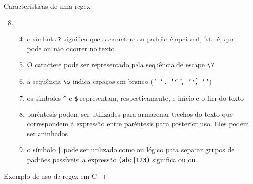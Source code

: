 \begin{frame}[fragile]{Características de uma regex}

    \begin{enumerate}
        \setcounter{enumi}{7}
        \item[] \begin{enumerate}
            \setcounter{enumii}{3}
            \item o símbolo \verb|?| significa que o caractere ou padrão é opcional, isto é, que pode ou não ocorrer no texto
        \pause
            \item O caractere  pode ser representado pela sequência de escape 
                \verb|\?|
        \pause
            \item a sequência \verb|\s| indica espaços em branco (\texttt{' ',  '\t', '\r', '\n'})
        \pause
            \item os símbolos \verb|^| e \verb|$| representam, respectivamente, o início e o fim 
                do texto
        \pause
            \item parêntesis podem ser utilizados para armazenar trechos do texto que correspondem à expressão entre parêntesis para posterior uso. Eles podem ser aninhados
        \pause
            \item o símbolo \texttt{|} pode ser utilizado como ou lógico para separar grupos de padrões possíveis: a expressão \texttt{(abc|123)} significa ou  ou 
        \end{enumerate}
    \end{enumerate}

\end{frame}

\begin{frame}[fragile]{Exemplo de uso de regex em C++}
\end{frame}
